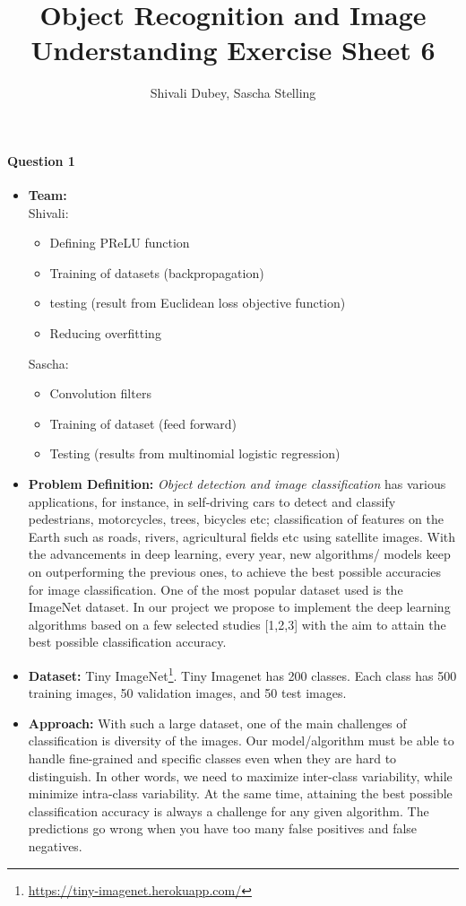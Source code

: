 \documentclass[10pt,a4]{article}
\author{Shivali Dubey, Sascha Stelling}
\title{Object Recognition and Image Understanding Exercise Sheet 6}
\begin{document}
\maketitle

\paragraph{Question 1}
\begin{itemize}
	\item \textbf{Team:} \\Shivali:
	\begin{itemize}
		\item Defining PReLU function
		\item Training of datasets (backpropagation)
		\item testing (result from Euclidean loss objective function)
		\item Reducing overfitting
	\end{itemize}
	Sascha:
	\begin{itemize}
		\item Convolution filters
		\item Training of dataset (feed forward)
		\item Testing (results from multinomial logistic regression)
	\end{itemize}
	\item \textbf{Problem Definition:} \textit{Object detection and image classification} has various applications, for instance, in self-driving cars to detect and classify pedestrians, motorcycles, trees, bicycles etc; classification of features on the Earth such as roads, rivers, agricultural fields etc using satellite images. With the advancements in deep learning, every year, new algorithms/ models keep on outperforming the previous ones, to achieve the best possible accuracies for image classification. One of the most popular dataset used is the ImageNet dataset. In our project we propose to implement the deep learning algorithms based on a few selected studies [1,2,3] with the aim to attain the best possible classification accuracy.
	
	\item \textbf{Dataset:} Tiny ImageNet\footnote{\url{https://tiny-imagenet.herokuapp.com/}}. Tiny Imagenet has 200 classes. Each class has 500 training images, 50 validation images, and 50 test images.
	
	\item \textbf{Approach:} With such a large dataset, one of the main challenges of classification is diversity of the images. Our model/algorithm must be able to handle fine-grained and specific classes even when they are hard to distinguish. In other words, we need to maximize inter-class variability, while minimize intra-class variability. At the same time, attaining the best possible classification accuracy is always a challenge for any given algorithm. The predictions go wrong when you have too many false positives and false negatives.
	

\end{itemize}
\end{document}
